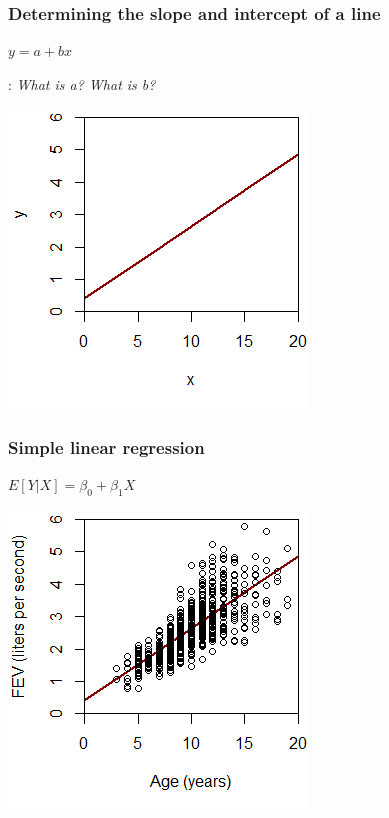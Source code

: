 \documentclass[12pt, 
hyperref={colorlinks=true, linkcolor=blue, urlcolor=cyan},dvipsnames]{beamer}
\begin{document}
\begin{frame}
\frametitle{Determining the slope and intercept of a line}

\center
\begin{large} \color{red} $y = a + bx$ \end{large} \color{black}: \textit{What is a? What is b?}

\vspace{-0.2cm} \includegraphics{./plots/plot_y_vs_x} %

\end{frame}

\begin{frame}
\frametitle{Simple linear regression}

\center
\begin{large} \color{red} $E[Y|X] = \beta_0 + \beta_1 X$ \end{large} 

\vspace{-0.2cm} \includegraphics{./plots/plot_fev_vs_age}

\end{frame}
\end{document}
